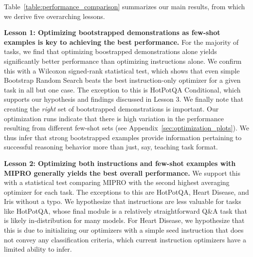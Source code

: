\begin{table}[h]
{\begin{tabular}
\bottomrule
\end{tabular}}
\caption{Results averaged across 5 runs, divided into optimizing instructions only (i.e., ``0-shot'' prompts), demonstrations only, and both. The best performing values in each column are highlighted in bold. These bold values represent the highest average scores compared to the second-highest, with significance supported by Wilcoxon signed-rank tests (p < .05) between the corresponding run averages. If significance is not confirmed, multiple results are bolded to denote their comparable performance.}
\vspace{-3mm}
\label{table:performance_comparison}
\end{table}











Table~\ref{table:performance_comparison} summarizes our main results, from which we derive five overarching lessons.

\textbf{Lesson 1: Optimizing bootstrapped demonstrations as few-shot examples is key to achieving the best performance.} For the majority of tasks, we find that optimizing boostrapped demonstrations alone yields significantly better performance than optimizing instructions alone. We confirm this with a Wilcoxon signed-rank statistical test, which shows that even simple Bootstrap Random Search beats the best instruction-only optimizer for a given task in all but one case. The exception to this is HotPotQA Conditional, which supports our hypothesis and findings discussed in Lesson 3. We finally note that creating the \textit{right} set of bootstrapped demonstrations is important. Our optimization runs  indicate that there is high variation in the performance resulting from different few-shot sets (see Appendix~\ref{sec:optimization_plots}). We thus infer that strong bootstrapped examples provide information pertaining to successful reasoning behavior more than just, say, teaching task format.

\textbf{Lesson 2: Optimizing both instructions and few-shot examples  with MIPRO generally yields the best overall performance.} 
We support this with a statistical test comparing MIPRO with the second highest averaging optimizer for each task. The exceptions to this are HotPotQA, Heart Disease, and Iris without a typo. We hypothesize that instructions are less valuable for tasks like HotPotQA, whose final module is a relatively straightforward Q\&A task that is likely in-distribution for many models. For Heart Disease, we hypothesize that this is due to initializing our optimizers with a simple seed instruction that does not convey any classification criteria, which current instruction optimizers have a limited ability to infer. 

